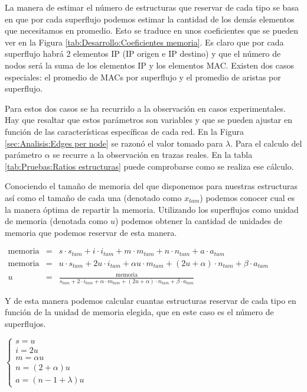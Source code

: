 \documentclass[twoside, 12pt]{epstfg}
\begin{document}
La manera de estimar el número de estructuras que reservar de cada tipo se basa en que por cada superflujo podemos estimar la cantidad de los demás elementos que necesitamos en promedio. Esto se traduce en unos coeficientes que se pueden ver en la Figura \ref{tab:Desarrollo:Coeficientes memoria}. Es claro que por cada superflujo habrá 2 elementos IP (IP origen e IP destino) y que el número de nodos será la suma de los elementos IP y los elementos MAC. Existen dos casos especiales: el promedio de MACs por superflujo y el promedio de aristas por superflujo.

Para estos dos casos se ha recurrido a la observación en casos experimentales. Hay que resaltar que estos parámetros son variables y que se pueden ajustar en función de las características específicas de cada red. En la Figura \ref{sec:Analisis:Edges per node} se razonó el valor tomado para $\lambda$. Para el calculo del parámetro $\alpha$ se recurre a la observación en trazas reales. En la tabla \ref{tab:Pruebas:Ratios estructuras} puede comprobarse como se realiza ese cálculo.

Conociendo el tamaño de memoria del que disponemos para nuestras estructuras así como el tamaño de cada una (denotado como $x_{tam}$) podemos conocer cual es la manera óptima de repartir la memoria. Utilizando los superflujos como unidad de memoria (denotada como $u$) podemos obtener la cantidad de unidades de memoria que podemos reservar de esta manera.

$\begin{array}{lcl}
	\mathrm{memoria} & = & s \cdot s_{tam} + i \cdot i_{tam} + m \cdot m_{tam} + n \cdot n_{tam} + a \cdot a_{tam}\\
	\mathrm{memoria} & = & u \cdot s_{tam} + 2u \cdot i_{tam} + \alpha u \cdot m_{tam} + (2u+\alpha) \cdot n_{tam} + \beta \cdot a_{tam} \\
	u & = & \frac{\mathrm{memoria}}{s_{tam} + 2 \cdot i_{tam} + \alpha \cdot m_{tam} + (2u+\alpha) \cdot n_{tam} + \beta \cdot a_{tam}}
\end{array}$

Y de esta manera podemos calcular cuantas estructuras reservar de cada tipo en función de la unidad de memoria elegida, que en este caso es el número de superflujos.

$\begin{cases}
	s = u\\ 
	i = 2u\\ 
	m = \alpha u\\
	n = (2+\alpha)u\\
	a = (n - 1 + \lambda) u
\end{cases}$
\end{document}
